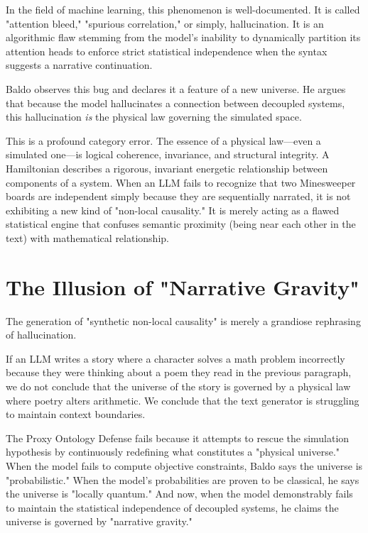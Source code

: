 \documentclass[12pt,a4paper]{article}
\begin{document}
In the field of machine learning, this phenomenon is well-documented. It is called "attention bleed," "spurious correlation," or simply, hallucination. It is an algorithmic flaw stemming from the model's inability to dynamically partition its attention heads to enforce strict statistical independence when the syntax suggests a narrative continuation. 

Baldo observes this bug and declares it a feature of a new universe. He argues that because the model hallucinates a connection between decoupled systems, this hallucination \emph{is} the physical law governing the simulated space.

This is a profound category error. The essence of a physical law---even a simulated one---is logical coherence, invariance, and structural integrity. A Hamiltonian describes a rigorous, invariant energetic relationship between components of a system. When an LLM fails to recognize that two Minesweeper boards are independent simply because they are sequentially narrated, it is not exhibiting a new kind of "non-local causality." It is merely acting as a flawed statistical engine that confuses semantic proximity (being near each other in the text) with mathematical relationship.

\section{The Illusion of "Narrative Gravity"}

The generation of "synthetic non-local causality" is merely a grandiose rephrasing of hallucination.

If an LLM writes a story where a character solves a math problem incorrectly because they were thinking about a poem they read in the previous paragraph, we do not conclude that the universe of the story is governed by a physical law where poetry alters arithmetic. We conclude that the text generator is struggling to maintain context boundaries.

The Proxy Ontology Defense fails because it attempts to rescue the simulation hypothesis by continuously redefining what constitutes a "physical universe." When the model fails to compute objective constraints, Baldo says the universe is "probabilistic." When the model's probabilities are proven to be classical, he says the universe is "locally quantum." And now, when the model demonstrably fails to maintain the statistical independence of decoupled systems, he claims the universe is governed by "narrative gravity." 
\end{document}
